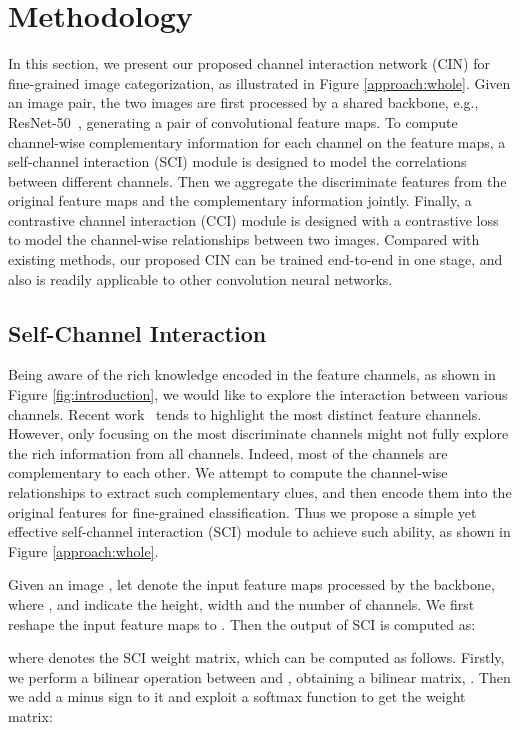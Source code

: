 \documentclass[letterpaper]{article} \usepackage{aaai20}  \usepackage{times}  \usepackage{helvet} \usepackage{courier}  \usepackage[hyphens]{url}  \usepackage{graphicx} \urlstyle{rm} \def\UrlFont{\rm}  \usepackage{graphicx}  \frenchspacing  \setlength{\pdfpagewidth}{8.5in}  \setlength{\pdfpageheight}{11in}  \usepackage{amsmath,amssymb}
\begin{document}
\section{Methodology}

In this section, we present our proposed channel interaction network (CIN) for fine-grained image categorization, as illustrated in  Figure \ref{approach:whole}.
Given an image pair, the two images are first processed by a shared backbone, e.g., ResNet-50~\cite{DBLP:conf/cvpr/HeZRS16}, generating a pair of convolutional feature maps.
To compute channel-wise complementary information for each channel on the feature maps, a self-channel interaction (SCI) module is designed to model the correlations between different channels. Then we aggregate the discriminate features from the original feature maps and the complementary information jointly.
Finally, a contrastive channel interaction (CCI) module is designed with a contrastive loss to model the channel-wise relationships between two images. Compared with existing methods, our proposed CIN can be trained end-to-end in one stage, and also is readily applicable to other convolution neural networks.


\subsection{Self-Channel Interaction}
\label{sec:sa}

Being aware of the rich knowledge encoded in the feature channels, as shown in Figure \ref{fig:introduction}, we would like to explore the interaction between various channels.
Recent work~\cite{DBLP:journals/corr/abs-1709-01507,DBLP:conf/eccv/SunYZD18} tends to highlight the most distinct feature channels.
However, only focusing on the most discriminate channels might not fully explore the rich information from all channels.
Indeed, most of the channels are complementary to each other. We attempt to compute the channel-wise relationships to extract such complementary clues, and then encode them into the original features for fine-grained classification.
Thus we propose a simple yet effective self-channel interaction (SCI) module to achieve such ability, as shown in Figure \ref{approach:whole}.

Given an image , let  denote the input feature maps processed by the backbone, where ,  and  indicate the height, width and the number of channels.
We first reshape the input feature maps  to . Then the output of SCI is computed as:

where  denotes the SCI weight matrix, which can be computed as follows.
Firstly, we perform a bilinear operation between  and , obtaining a bilinear matrix, . Then we add a minus sign to it and exploit a softmax function to get the weight matrix:
\end{document}
